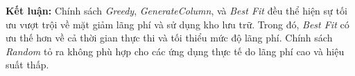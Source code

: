 \textbf{Kết luận:} Chính sách \textit{Greedy}, \textit{GenerateColumn}, và \textit{Best Fit} đều thể hiện sự tối ưu vượt trội về mặt giảm lãng phí và sử dụng kho lưu trữ. Trong đó, \textit{Best Fit} có ưu thế hơn về cả thời gian thực thi và tối thiểu mức độ lãng phí. Chính sách \textit{Random} tỏ ra không phù hợp cho các ứng dụng thực tế do lãng phí cao và hiệu suất thấp.


